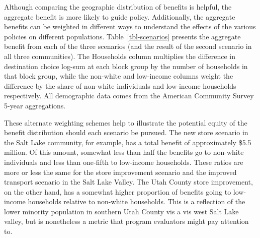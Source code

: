 \documentclass[
  letterpaper,
  number,
  review,
  3p]{elsarticle}
\begin{document}
\begin{table}

\caption{\label{tbl-scenarios}Scenario Benefits}


\end{table}%

Although comparing the geographic distribution of benefits is helpful,
the aggregate benefit is more likely to guide policy. Additionally, the
aggregate benefits can be weighted in different ways to understand the
effects of the various policies on different populations.
Table~\ref{tbl-scenarios} presents the aggregate benefit from each of
the three scenarios (and the result of the second scenario in all three
communities). The Households column multiplies the difference in
destination choice log-sum at each block group by the number of
households in that block group, while the non-white and low-income
columns weight the difference by the share of non-white individuals and
low-income households respectively. All demographic data comes from the
American Community Survey 5-year aggregations.

These alternate weighting schemes help to illustrate the potential
equity of the benefit distribution should each scenario be pursued. The
new store scenario in the Salt Lake community, for example, has a total
benefit of approximately \$5.5 million. Of this amount, somewhat less
than half the benefits go to non-white individuals and less than
one-fifth to low-income households. These ratios are more or less the
same for the store improvement scenario and the improved transport
scenario in the Salt Lake Valley. The Utah County store improvement, on
the other hand, has a somewhat higher proportion of benefits going to
low-income households relative to non-white households. This is a
reflection of the lower minority population in southern Utah County vis
a vis west Salt Lake valley, but is nonetheless a metric that program
evaluators might pay attention to.
\end{document}
